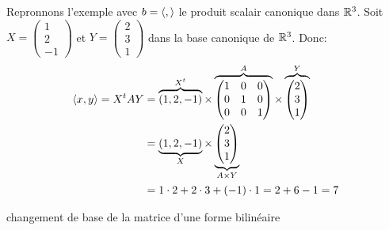 \begin{eg}
    Repronnons l'exemple avec $b = \langle , \rangle$ le produit scalair canonique dans  $\mathbb{R}^3$. Soit $X = \begin{pmatrix} 1 \\ 2 \\ -1 \end{pmatrix}$ et $Y = \begin{pmatrix} 2 \\ 3 \\ 1 \end{pmatrix} $ dans la base canonique de $\mathbb{R}^3$. Donc:
    \begin{align*}
        \langle x, y \rangle = X^{t}AY &= \overbrace{(1, 2, -1)}^{X^{t}} \times \overbrace{\begin{pmatrix} 1 & 0 & 0\\ 0 & 1 & 0\\ 0 & 0 & 1 \end{pmatrix}}^{A} \times \overbrace{ \begin{pmatrix} 2 \\ 3 \\ 1 \end{pmatrix} }^{Y} \\
                                 &= \underbrace{(1, 2, -1)}_{X} \times \underbrace{ \begin{pmatrix} 2 \\ 3\\ 1 \end{pmatrix} }_{A \times Y} \\
                                 &= 1 \cdot 2 + 2 \cdot 3 + (-1) \cdot 1 = 2 + 6 - 1 = 7
    \end{align*}
\end{eg}
\begin{TODO}
   changement de base de la matrice d'une forme bilinéaire 
\end{TODO}

